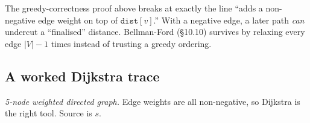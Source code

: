 \documentclass[11pt]{article}
\begin{document}
The greedy-correctness proof above breaks at exactly the line
``adds a non-negative edge weight on top of $\texttt{dist}[v]$.''
With a negative edge, a later path \emph{can} undercut a
``finalised'' distance. Bellman-Ford (\S10.10) survives by relaxing
every edge $|V| - 1$ times instead of trusting a greedy ordering.

\subsection*{A worked Dijkstra trace}

\begin{center}
\end{center}

\emph{5-node weighted directed graph.} Edge weights are all
non-negative, so Dijkstra is the right tool. Source is $s$.
\end{document}
